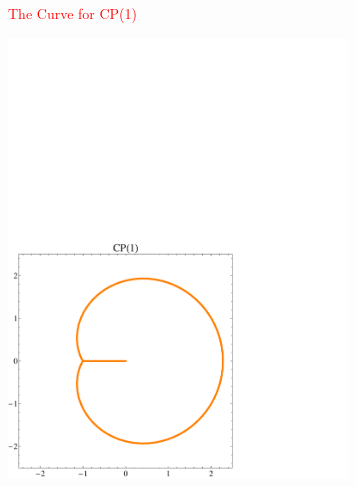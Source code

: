 \documentclass[12pt,letterpaper,landscape,KOMA,smallheadings,calcdimensions,display]{powersem}
\begin{document}
\begin{slide}

\centerline{\textcolor{red}{\Large The Curve for CP(1)}}

\vspace{-4.5cm}
\begin{center}
\hspace{2.5cm}
\includegraphics[width=9.0cm]{ccp1.pdf}
\end{center}

\end{slide}
\end{document}
